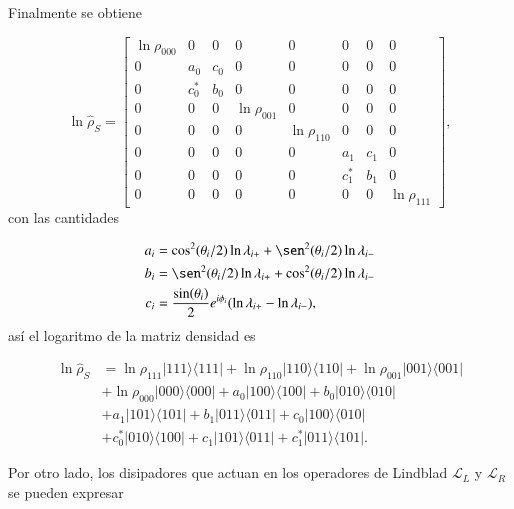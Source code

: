 \begin{appendixs}
Finalmente se obtiene

\begin{equation*}
    \ln \hat{\rho}_{S} = 
    \begin{bmatrix}
        \ln \rho_{000} & 0 & 0 & 0 & 0 & 0 & 0 & 0 \\
        0 & a_{0} & c_{0} & 0 & 0 & 0 & 0 & 0 \\
        0 & c^{*}_{0} & b_{0} & 0 & 0 & 0 & 0 & 0 \\
        0 & 0 & 0 & \ln \rho_{001} & 0 & 0 & 0 & 0 \\
        0 & 0 & 0 & 0 & \ln \rho_{110} & 0 & 0 & 0 \\
        0 & 0 & 0 & 0 & 0 & a_{1} & c_{1} & 0 \\
        0 & 0 & 0 & 0 & 0 & c^{*}_{1} & b_{1} & 0 \\
        0 & 0 & 0 & 0 & 0 & 0 & 0 & \ln \rho_{111} 
        \end{bmatrix},
\end{equation*}
con las cantidades 

\begin{align*}
    a_{i} & = \cos^{2}(\theta_{i}/2) \ln \lambda_{i+} + \sen^{2}(\theta_{i}/2) \ln \lambda_{i-} \\
    b_{i} & = \sen^{2}(\theta_{i}/2) \ln \lambda_{i+} + \cos^{2}(\theta_{i}/2) \ln \lambda_{i-}  \\
    c_{i} & = \frac{\sin(\theta_{i})}{2}e^{i\phi_{i}} (\ln \lambda_{i+} - \ln \lambda_{i-}),    
\end{align*}
así el logaritmo de la matriz densidad es 

\begin{align*}
    \ln \hat{\rho}_{S} & = \ln \rho_{111}|111\rangle \langle 111| + \ln \rho_{110}|110\rangle \langle 110| + \ln \rho_{001}|001\rangle \langle 001| \\ 
     & + \ln \rho_{000}|000\rangle \langle 000| + a_{0}|100\rangle \langle 100| + b_{0}|010\rangle \langle 010|  \\  
     & + a_{1}|101\rangle \langle 101| + b_{1}|011\rangle\langle 011| + c_{0}|100\rangle \langle 010| \\ 
     & + c^{*}_{0}|010\rangle \langle 100| + c_{1}|101\rangle \langle 011| + c^{*}_{1}|011\rangle \langle 101|.
\end{align*}

Por otro lado, los disipadores que actuan en los operadores de Lindblad $\mathcal{L}_{L}$ y $\mathcal{L}_{R}$ se pueden expresar 


\end{appendixs}
